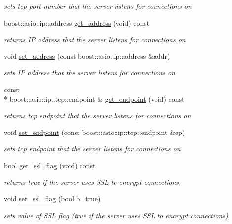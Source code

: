 \begin{DoxyCompactItemize}
\begin{DoxyCompactList}\small\item\em sets tcp port number that the server listens for connections on \end{DoxyCompactList}\item 
boost\-::asio\-::ip\-::address \hyperlink{classpion_1_1tcp_1_1server_a4ed7743219642eb5969e3599403ad99f}{get\-\_\-address} (void) const 
\begin{DoxyCompactList}\small\item\em returns I\-P address that the server listens for connections on \end{DoxyCompactList}\item 
void \hyperlink{classpion_1_1tcp_1_1server_aa711c8de12d16c2806dc5fe57bed512e}{set\-\_\-address} (const boost\-::asio\-::ip\-::address \&addr)
\begin{DoxyCompactList}\small\item\em sets I\-P address that the server listens for connections on \end{DoxyCompactList}\item 
const \\*
boost\-::asio\-::ip\-::tcp\-::endpoint \& \hyperlink{classpion_1_1tcp_1_1server_adb38f532cf2c4f798c10a9273e7af436}{get\-\_\-endpoint} (void) const 
\begin{DoxyCompactList}\small\item\em returns tcp endpoint that the server listens for connections on \end{DoxyCompactList}\item 
void \hyperlink{classpion_1_1tcp_1_1server_a2f460aa6795aa6169c1b1fca5c4daa21}{set\-\_\-endpoint} (const boost\-::asio\-::ip\-::tcp\-::endpoint \&ep)
\begin{DoxyCompactList}\small\item\em sets tcp endpoint that the server listens for connections on \end{DoxyCompactList}\item 
bool \hyperlink{classpion_1_1tcp_1_1server_a90c7fd50d43652de3f283988380968bb}{get\-\_\-ssl\-\_\-flag} (void) const 
\begin{DoxyCompactList}\small\item\em returns true if the server uses S\-S\-L to encrypt connections \end{DoxyCompactList}\item 
void \hyperlink{classpion_1_1tcp_1_1server_ac6bb13e1f833a39b28bff7fa71029476}{set\-\_\-ssl\-\_\-flag} (bool b=true)
\begin{DoxyCompactList}\small\item\em sets value of S\-S\-L flag (true if the server uses S\-S\-L to encrypt connections) \end{DoxyCompactList}\item 

\end{DoxyCompactItemize}
